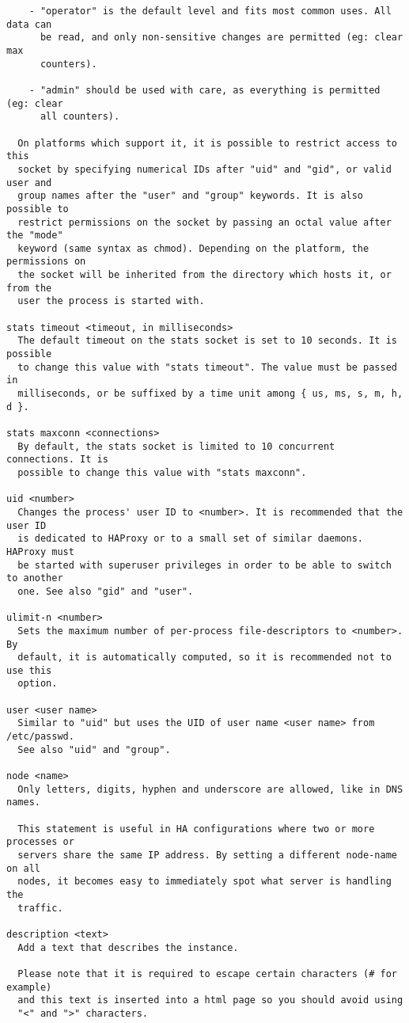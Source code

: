 \begin{verbatim}
    - "operator" is the default level and fits most common uses. All data can
      be read, and only non-sensitive changes are permitted (eg: clear max
      counters).

    - "admin" should be used with care, as everything is permitted (eg: clear
      all counters).

  On platforms which support it, it is possible to restrict access to this
  socket by specifying numerical IDs after "uid" and "gid", or valid user and
  group names after the "user" and "group" keywords. It is also possible to
  restrict permissions on the socket by passing an octal value after the "mode"
  keyword (same syntax as chmod). Depending on the platform, the permissions on
  the socket will be inherited from the directory which hosts it, or from the
  user the process is started with.

stats timeout <timeout, in milliseconds>
  The default timeout on the stats socket is set to 10 seconds. It is possible
  to change this value with "stats timeout". The value must be passed in
  milliseconds, or be suffixed by a time unit among { us, ms, s, m, h, d }.

stats maxconn <connections>
  By default, the stats socket is limited to 10 concurrent connections. It is
  possible to change this value with "stats maxconn".

uid <number>
  Changes the process' user ID to <number>. It is recommended that the user ID
  is dedicated to HAProxy or to a small set of similar daemons. HAProxy must
  be started with superuser privileges in order to be able to switch to another
  one. See also "gid" and "user".

ulimit-n <number>
  Sets the maximum number of per-process file-descriptors to <number>. By
  default, it is automatically computed, so it is recommended not to use this
  option.

user <user name>
  Similar to "uid" but uses the UID of user name <user name> from /etc/passwd.
  See also "uid" and "group".

node <name>
  Only letters, digits, hyphen and underscore are allowed, like in DNS names.

  This statement is useful in HA configurations where two or more processes or
  servers share the same IP address. By setting a different node-name on all
  nodes, it becomes easy to immediately spot what server is handling the
  traffic.

description <text>
  Add a text that describes the instance.

  Please note that it is required to escape certain characters (# for example)
  and this text is inserted into a html page so you should avoid using
  "<" and ">" characters.


\end{verbatim}
